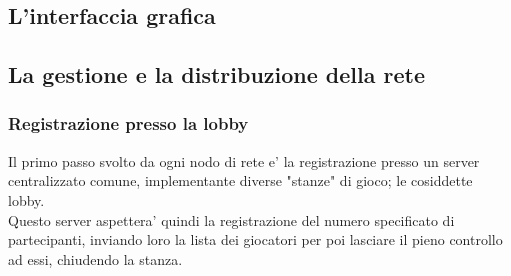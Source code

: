 \subsection{L'interfaccia grafica}
\subsection{La gestione e la distribuzione della rete}
	\subsubsection{Registrazione presso la lobby}
		Il primo passo svolto da ogni nodo di rete e' la registrazione
		presso un server centralizzato comune, implementante diverse
		"stanze" di gioco; le cosiddette lobby.\\
		Questo server aspettera' quindi la registrazione del numero
		specificato di partecipanti, inviando loro la lista dei
		giocatori per poi lasciare il pieno controllo
		ad essi, chiudendo la stanza.

